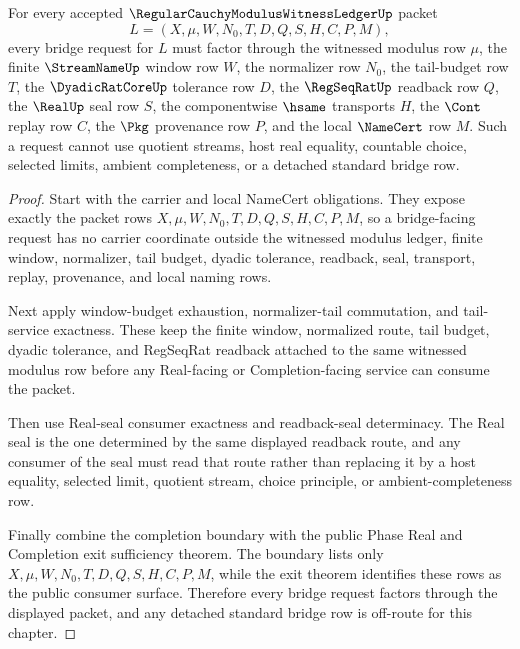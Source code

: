\begin{theorem}
\label{thm:regular-cauchy-modulus-witness-ledger-bridge-request-surface}
For every accepted $\RegularCauchyModulusWitnessLedgerUp$ packet
$$
L=(X,\mu,W,N_0,T,D,Q,S,H,C,P,M),
$$
every bridge request for $L$ must factor through the witnessed modulus row $\mu$, the finite $\StreamNameUp$ window row $W$, the normalizer row $N_0$, the tail-budget row $T$, the $\DyadicRatCoreUp$ tolerance row $D$, the $\RegSeqRatUp$ readback row $Q$, the $\RealUp$ seal row $S$, the componentwise $\hsame$ transports $H$, the $\Cont$ replay row $C$, the $\Pkg$ provenance row $P$, and the local $\NameCert$ row $M$. Such a request cannot use quotient streams, host real equality, countable choice, selected limits, ambient completeness, or a detached standard bridge row.
\end{theorem}
\begin{proof}
Start with the carrier and local NameCert obligations. They expose exactly the packet rows $X,\mu,W,N_0,T,D,Q,S,H,C,P,M$, so a bridge-facing request has no carrier coordinate outside the witnessed modulus ledger, finite window, normalizer, tail budget, dyadic tolerance, readback, seal, transport, replay, provenance, and local naming rows.

Next apply window-budget exhaustion, normalizer-tail commutation, and tail-service exactness. These keep the finite window, normalized route, tail budget, dyadic tolerance, and RegSeqRat readback attached to the same witnessed modulus row before any Real-facing or Completion-facing service can consume the packet.

Then use Real-seal consumer exactness and readback-seal determinacy. The Real seal is the one determined by the same displayed readback route, and any consumer of the seal must read that route rather than replacing it by a host equality, selected limit, quotient stream, choice principle, or ambient-completeness row.

Finally combine the completion boundary with the public Phase Real and Completion exit sufficiency theorem. The boundary lists only $X,\mu,W,N_0,T,D,Q,S,H,C,P,M$, while the exit theorem identifies these rows as the public consumer surface. Therefore every bridge request factors through the displayed packet, and any detached standard bridge row is off-route for this chapter.
\end{proof}

